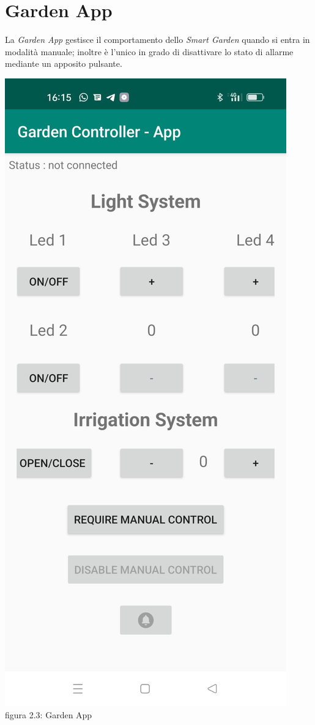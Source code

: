 \documentclass[a4paper,12pt]{report}
\begin{document}
\section{Garden App}
La \textit{Garden App} gestisce il comportamento dello \textit{Smart Garden} quando si entra in modalità manuale; inoltre è l'unico in grado di disattivare lo stato di allarme mediante un apposito pulsante.
\begin{center}
	\includegraphics[scale = 0.2]{app}
	\\figura 2.3: Garden App
\end{center}
\end{document}
